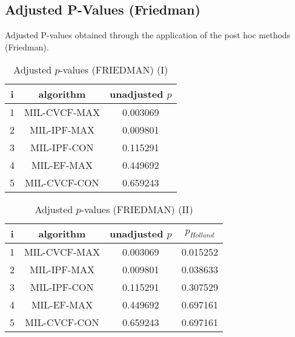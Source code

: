 \documentclass[a4paper,10pt]{article}
\begin{document}
\begin{landscape}
\newpage

\section{Adjusted P-Values (Friedman)}


Adjusted P-values obtained through the application of the post hoc methods (Friedman).

\begin{table}[!htp]
\centering\small
\begin{tabular}{ccc}
i&algorithm&unadjusted $p$\\
\hline1&MIL-CVCF-MAX&0.003069\\2&MIL-IPF-MAX&0.009801\\3&MIL-IPF-CON&0.115291\\4&MIL-EF-MAX&0.449692\\5&MIL-CVCF-CON&0.659243\\\hline
\end{tabular}
\caption{Adjusted $p$-values (FRIEDMAN) (I)}
\end{table}
\begin{table}[!htp]
\centering\small
\begin{tabular}{cccc}
i&algorithm&unadjusted $p$&$p_{Holland}$\\
\hline1&MIL-CVCF-MAX&0.003069&0.015252\\2&MIL-IPF-MAX&0.009801&0.038633\\3&MIL-IPF-CON&0.115291&0.307529\\4&MIL-EF-MAX&0.449692&0.697161\\5&MIL-CVCF-CON&0.659243&0.697161\\\hline
\end{tabular}
\caption{Adjusted $p$-values (FRIEDMAN) (II)}
\end{table}

\newpage
\end{landscape}
\end{document}
